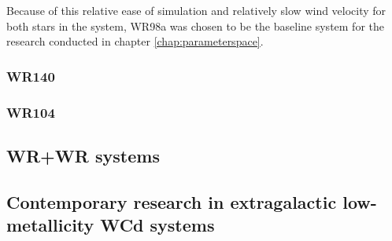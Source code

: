 Because of this relative ease of simulation and relatively slow wind velocity for both stars in the system, WR98a was chosen to be the baseline system for the research conducted in chapter \ref{chap:parameterspace}.

\subsubsection{WR140}






\subsubsection{WR104}





\subsection{WR+WR systems}

\subsection{Contemporary research in extragalactic low-metallicity WCd systems}

\label{sec:knowndustysystems}


